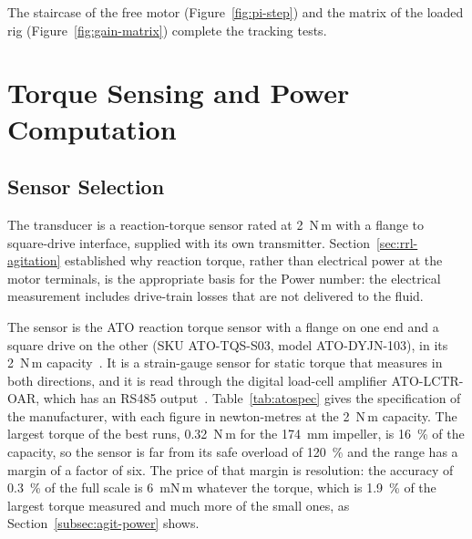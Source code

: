 The staircase of the free motor (Figure~\ref{fig:pi-step}) and the matrix of the loaded rig (Figure~\ref{fig:gain-matrix}) complete the tracking tests.



\section{Torque Sensing and Power Computation}
\label{sec:agit-torque}

\subsection{Sensor Selection}
\label{subsec:agit-torque-sel}

The transducer is a reaction-torque sensor rated at 2~N\,m with a flange to square-drive interface, supplied with its own transmitter. Section~\ref{sec:rrl-agitation} established why reaction torque, rather than electrical power at the motor terminals, is the appropriate basis for the Power number: the electrical measurement includes drive-train losses that are not delivered to the fluid.

The sensor is the ATO reaction torque sensor with a flange on one end and a square drive on the other (SKU ATO-TQS-S03, model ATO-DYJN-103), in its 2~N\,m capacity~\citep{atotqs2026}. It is a strain-gauge sensor for static torque that measures in both directions, and it is read through the digital load-cell amplifier ATO-LCTR-OAR, which has an RS485 output~\citep{atoamp2026}. Table~\ref{tab:atospec} gives the specification of the manufacturer, with each figure in newton-metres at the 2~N\,m capacity. The largest torque of the best runs, 0.32~N\,m for the 174~mm impeller, is 16~\% of the capacity, so the sensor is far from its safe overload of 120~\% and the range has a margin of a factor of six. The price of that margin is resolution: the accuracy of 0.3~\% of the full scale is 6~mN\,m whatever the torque, which is 1.9~\% of the largest torque measured and much more of the small ones, as Section~\ref{subsec:agit-power} shows.

